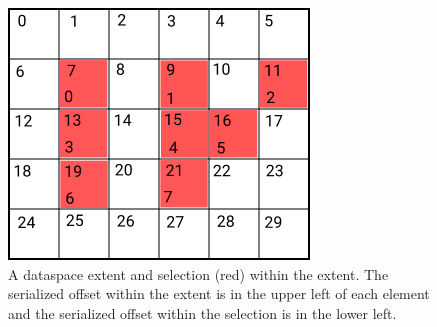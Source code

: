 \begin{figure}[h]
\centering
\includegraphics[scale=0.8]{images/Dataspace_serial_offsets.png}
\caption{A dataspace extent and selection (red) within the extent. The serialized offset within the extent is in the upper left of each element and the serialized offset within the selection is in the lower left.}
\label{fig:serial-offsets}
\end{figure}

